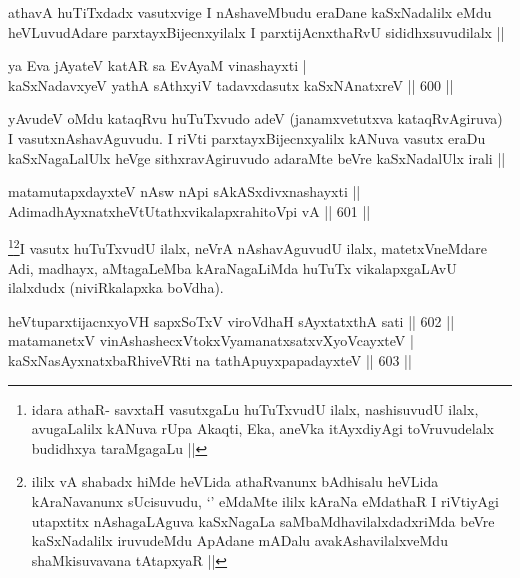 \begin{artha}
athavA huTiTxdadx vasutxvige I nAshaveMbudu eraDane kaSxNadalilx eMdu heVLuvudAdare parxtayxBijecnxyilalx I parxtijAcnxthaRvU sididhxsuvudilalx ||
\end{artha}


\begin{shl}
ya Eva jAyateV katAR sa EvAyaM vinashayxti | \\
kaSxNadavxyeV yathA sAthxyiV tadavxdasutx kaSxNAnatxreV \hfill||  600 ||  
\end{shl}

\begin{artha}
yAvudeV oMdu kataqRvu huTuTxvudo adeV (janamxvetutxva kataqRvAgiruva) I vasutxnAshavAguvudu. I riVti parxtayxBijecnxyalilx kANuva vasutx eraDu kaSxNagaLalUlx heVge sithxravAgiruvudo adaraMte beVre kaSxNadalUlx irali ||
\end{artha}


\begin{shl}
matamutapxdayxteV nAsw nApi sAkASxdivxnashayxti ||  \\
AdimadhAyxnatxheVtUtathxvikalapxrahitoV\s pi vA \hfill||  601 ||  
\end{shl}

\begin{artha}
\footnote{idara athaR- savxtaH vasutxgaLu huTuTxvudU ilalx, nashisuvudU ilalx, avugaLalilx kANuva rUpa Akaqti, Eka, aneVka itAyxdiyAgi toVruvudelalx budidhxya taraMgagaLu ||}\footnote{ililx vA shabadx hiMde heVLida athaRvanunx bAdhisalu heVLida kAraNavanunx sUcisuvudu, `\stext' eMdaMte ililx kAraNa eMdathaR I riVtiyAgi utapxtitx nAshagaLAguva kaSxNagaLa saMbaMdhavilalxdadxriMda beVre kaSxNadalilx iruvudeMdu ApAdane mADalu avakAshavilalxveMdu shaMkisuvavana tAtapxyaR ||}I vasutx huTuTxvudU ilalx, neVrA nAshavAguvudU ilalx, matetxVneMdare Adi, madhayx, aMtagaLeMba kAraNagaLiMda huTuTx vikalapxgaLAvU ilalxdudx (niviRkalapxka boVdha).
\end{artha}


\begin{shl}
heVtuparxtijacnxyoVH sapxSoTxV viroVdhaH sAyxtatxthA sati \hfill||  602 ||  \\
matamanetxV vinAshashecxVtokxV\s yamanatxsatxvXyoVcayxteV | \\
kaSxNasAyxnatxbaRhiveVRti na tathA\s puyxpapadayxteV \hfill||  603 ||  
\end{shl}

